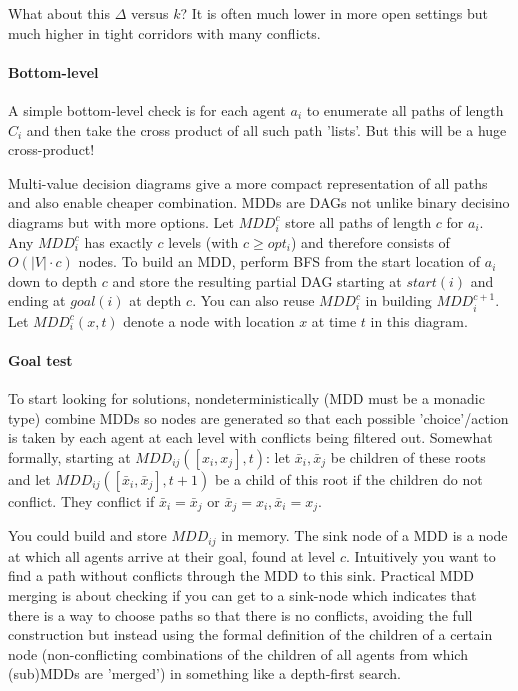 \documentclass[a4paper,10pt,english]{article}
\begin{document}
	What about this $\Delta$ versus $k$? It is often much lower in more open settings but much higher in tight corridors with many conflicts.
	\paragraph{Bottom-level}
	A simple bottom-level check is for each agent $a_i$ to enumerate all paths of length $C_i$ and then take the cross product of all such path 'lists'. But this will be a huge cross-product!
	
	Multi-value decision diagrams give a more compact representation of all paths and also enable cheaper combination. MDDs are DAGs not unlike binary decisino diagrams but with more options. Let $MDD^c_i$ store all paths of length $c$ for $a_i$. Any $MDD^c_i$ has exactly $c$ levels (with $c\geq opt_i$) and therefore consists of $O(|V| \cdot c)$ nodes. To build an MDD, perform BFS from the start location of $a_i$ down to depth $c$ and store the resulting partial DAG starting at $start(i)$ and ending at $goal(i)$ at depth $c$. You can also reuse $MDD^c_i$ in building $MDD^{c+1}_i$. Let $MDD^c_i(x,t)$ denote a node with location $x$ at time $t$ in this diagram. 	
	\paragraph{Goal test}
	To start looking for solutions, nondeterministically (MDD must be a monadic type) combine MDDs so nodes are generated so that each possible 'choice'/action is taken by each agent at each level with conflicts being filtered out. Somewhat formally, starting at $MDD_{ij}([x_i,x_j],t)$: let $\bar x_i,\bar x_j$ be children of these roots and let $MDD_{ij}([\bar x_i,\bar x_j],t+1)$ be a child of this root if the children do not conflict. They conflict if $\bar x_i = \bar x_j$ or $\bar x_j = x_i, \bar x_i = x_j$.
	
	You could build and store $MDD_{ij}$ in memory. The sink node of a MDD is a node at which all agents arrive at their goal, found at level $c$. Intuitively you want to find a path without conflicts through the MDD to this sink. Practical MDD merging is about checking if you can get to a sink-node which indicates that there is a way to choose paths so that there is no conflicts, avoiding the full construction but instead using the formal definition of the children of a certain node (non-conflicting combinations of the children of all agents from which (sub)MDDs are 'merged') in something like a depth-first search.
	
\end{document}
